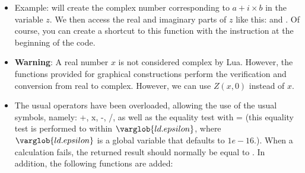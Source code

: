\begin{itemize}
    \item Example:  will create the complex number corresponding to \(a + i\times b\) in the variable $z$. We then access the real and imaginary parts of $z$ like this:  and . Of course, you can create a shortcut to this function with the instruction  at the beginning of the code.

    \item \textbf{Warning}: A real number $x$ is not considered complex by Lua. However, the functions provided for graphical constructions perform the verification and conversion from real to complex. However, we can use $Z(x,0)$ instead of $x$.

    \item The usual operators have been overloaded, allowing the use of the usual symbols, namely: +, x, -, /, as well as the equality test with = (this equality test is performed to within $\varglob{ld.epsilon}$, where $\varglob{ld.epsilon}$ is a global variable that defaults to $1e-16$.). When a calculation fails, the returned result should normally be equal to \nil.
In addition, the following functions are added:


\end{itemize}
